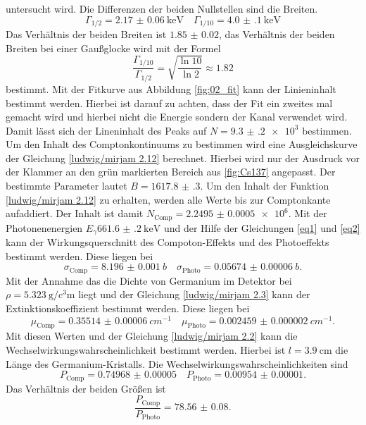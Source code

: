 untersucht wird.
Die Differenzen der beiden Nullstellen sind die Breiten.
\begin{equation*}
  \Gamma_{1/2} = \SI{2.17(6)}{\kilo\eV}\quad \Gamma_{1/10} = \SI{4.0(1)}{\kilo\eV}
\end{equation*}
Das Verhältnis der beiden Breiten ist $\num{1.85(2)}$, das Verhältnis der beiden Breiten bei einer Gaußglocke wird 
mit der Formel
\begin{equation*}
  \frac{\Gamma_{1/10}}{\Gamma_{1/2}}= \sqrt{\frac{\ln{10}}{\ln{2}}} \approx \num{1.82}
\end{equation*}
bestimmt.
Mit der Fitkurve aus Abbildung \ref{fig:02_fit} kann der Linieninhalt bestimmt werden. Hierbei ist darauf zu achten, dass der Fit ein zweites mal gemacht wird 
und hierbei nicht die Energie sondern der Kanal verwendet wird. Damit lässt sich der Lineninhalt des Peaks auf $N=\num{9.3(2)e3}$ bestimmen.
Um den Inhalt des Comptonkontinuums zu bestimmen wird eine Ausgleichskurve der Gleichung \eqref{ludwig/mirjam 2.12} berechnet.
Hierbei wird nur der Ausdruck vor der Klammer an den grün markierten Bereich aus \ref{fig:Cs137} angepasst.
Der bestimmte Parameter lautet $B=\num{1617.8(3)}$. Um den Inhalt der Funktion \ref{ludwig/mirjam 2.12} zu erhalten,
werden alle Werte bis zur Comptonkante aufaddiert. Der Inhalt ist damit $N_{\text{Comp}} = \num{2.2495(5)e6}$.
Mit der Photonenenergien $E_{\gamma}\SI{661.6(2)}{\kilo\eV}$ und der Hilfe der Gleichungen \eqref{eq1} und 
\eqref{eq2} kann der Wirkungsquerschnitt des Compoton-Effekts und des Photoeffekts bestimmt werden.
Diese liegen bei 
\begin{equation*}
  \sigma_{\text{Comp}}=\SI{8.196(1)}{b} \quad \sigma_{\text{Photo}}=\SI{0.05674(6)}{b}.
\end{equation*} 
Mit der Annahme das die Dichte von Germanium im Detektor bei $\rho = \SI{5.323}{\gram\per\cubic\centi\meter}$ \cite{Germanium_rho} liegt und der
Gleichung \eqref{ludwig/mirjam 2.3} kann der Extinktionskoeffizient bestimmt werden.
Diese liegen bei 
\begin{equation*}
  \mu_{\text{Comp}} = \SI{0.35514(6)}{cm^{-1}} \quad \mu_{\text{Photo}} = \SI{0.002459(2)}{cm^{-1}}.
\end{equation*}
Mit diesen Werten und der Gleichung \eqref{ludwig/mirjam 2.2} kann die Wechselwirkungswahrscheinlichkeit bestimmt werden.
Hierbei ist $l=\SI{3.9}{\centi\meter}$ die Länge des Germanium-Kristalls.
Die Wechselwirkungswahrscheinlichkeiten sind 
\begin{equation*}
  P_{\text{Comp}} = \num{0.74968(5)}\quad P_{\text{Photo}} = \num{0.00954(1)}.
\end{equation*}
Das Verhältnis der beiden Größen ist
\begin{equation*}
  \frac{P_{\text{Comp}} }{P_{\text{Photo}}} = \num{78.56(8)}.
\end{equation*}
